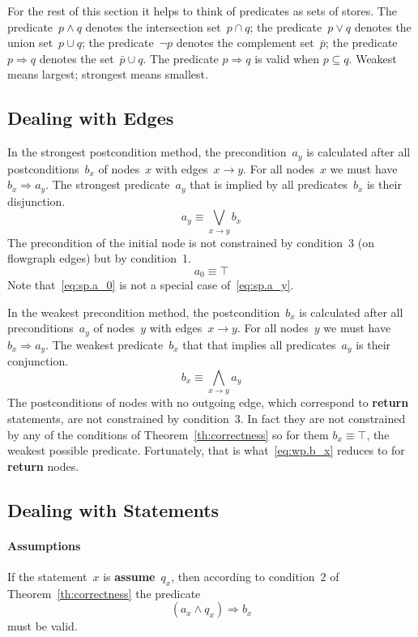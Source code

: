 \documentclass[a4paper]{article}
\newcommand{\limp}{\Rightarrow}
\newcommand{\tru}{\top}
\theoremstyle{slanted}
\theoremstyle{definition}
\theoremstyle{remark}
\begin{document}
For the rest of this section it helps to think of predicates as
sets of stores. The predicate~$p\land q$ denotes the intersection
set~$p\cap q$; the predicate~$p\lor q$ denotes the union
set~$p\cup q$; the predicate~$\lnot p$ denotes the complement
set~$\bar p$; the predicate~$p\limp q$ denotes the set~$\bar
p\cup q$. The predicate $p\limp q$ is valid when $p\subseteq q$.
Weakest means largest; strongest means smallest.

\subsection{Dealing with Edges}

In the strongest postcondition method, the precondition~$a_y$
is calculated after all postconditions~$b_x$ of nodes~$x$
with edges~$x\to y$. For all nodes~$x$ we must have $b_x\limp
a_y$. The strongest predicate~$a_y$ that is implied by all
predicates~$b_x$ is their disjunction.
\begin{equation}
a_y \equiv \bigvee_{x\to y} b_x
\label{eq:sp.a_y}
\end{equation}
The precondition of the initial node is not constrained
by condition~3 (on flowgraph edges) but by condition~1.
\begin{equation}
a_0 \equiv \tru
\label{eq:sp.a_0}
\end{equation}
Note that~\eqref{eq:sp.a_0} is not a special case
of~\eqref{eq:sp.a_y}.

In the weakest precondition method, the postcondition~$b_x$ is
calculated after all preconditions~$a_y$ of nodes~$y$ with
edges~$x\to y$. For all nodes~$y$ we must have $b_x\limp
a_y$. The weakest predicate~$b_x$ that that implies all
predicates~$a_y$ is their conjunction.
\begin{equation}
b_x \equiv \bigwedge_{x\to y} a_y
\label{eq:wp.b_x}
\end{equation}
The postconditions of nodes with no outgoing edge,
which correspond to \textbf{return} statements, are not
constrained by condition~3. In fact they are not constrained by
any of the conditions of Theorem~\ref{th:correctness} so for them
$b_x\equiv\tru$, the weakest possible predicate. Fortunately, that is
what~\eqref{eq:wp.b_x} reduces to for \textbf{return} nodes.

\subsection{Dealing with Statements}

\paragraph{Assumptions} If the statement~$x$ is
\textbf{assume}~$q_x$, then according to condition~2 of
Theorem~\ref{th:correctness} the predicate
\begin{equation}
(a_x \land q_x) \limp b_x
\end{equation}
must be valid.
\end{document}
